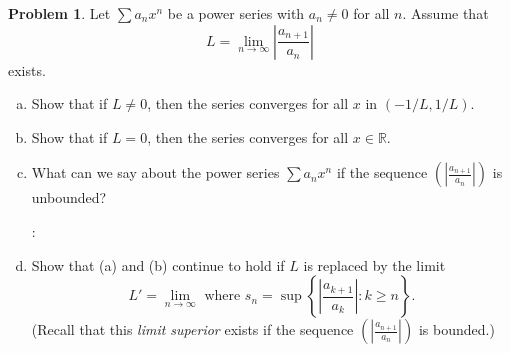 \documentclass{amsart}
\newcommand{\+}[1]{\ensuremath{\mathbf{#1}}}
\newcommand{\R}{{\mathbb R}}
\theoremstyle{definition}
\newtheorem{prob}{Problem}
\begin{document}
\begin{prob}
 Let $\sum a_n x^n$ be a power series with $a_n \neq 0$ for all $n$.
 Assume that
 \[
 L = \lim_{n \to \infty} \left| \frac{a_{n+1}}{a_n} \right|
 \]
 exists.
 \begin{enumerate}[(a)]
  \item Show that if $L \neq 0$, then the series
  converges for all $x$ in $(-1/L, 1/L)$.
  \item  Show that if $L = 0$, then the series
  converges for all $x \in \R$.
  \item
What can we say about the power series
$\sum a_n x^n$ if the sequence
$\left(\left|\frac{a_{n+1}}{a_n}\right|\right)$
is unbounded?

  \vspace{3mm}
  :
  \vspace{3mm}
  \item Show that (a) and (b)
  continue to hold if $L$ is replaced by the limit
  \[
  L' = \lim_{n \to \infty} \text{ where } s_n = \sup \left\{\left|\frac{a_{k+1}}{a_k}\right|:k \geq n\right\}.
  \]
(Recall that this \emph{limit superior} exists if
the sequence $\left(\left|\frac{a_{n+1}}{a_n}\right|\right)$
is bounded.)  
  \end{enumerate}
\end{prob}
\end{document}
